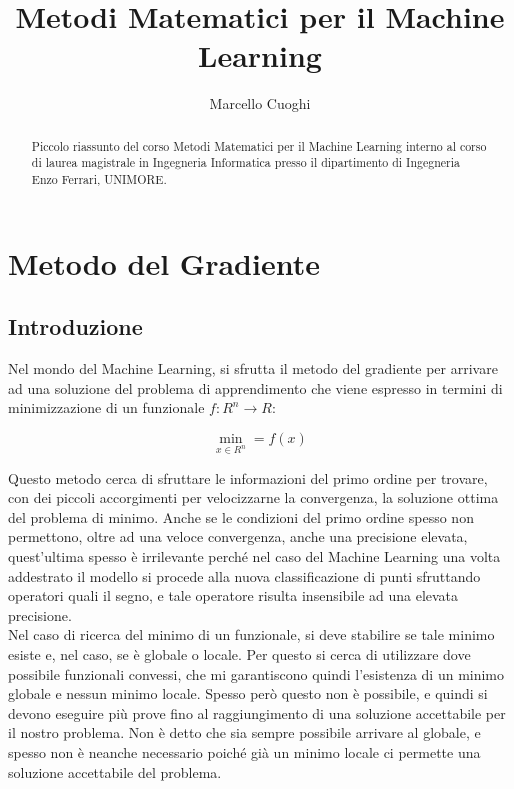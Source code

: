 \documentclass{report}
\begin{document}
 \title{Metodi Matematici per il Machine Learning}
\author{Marcello Cuoghi}

\maketitle

\newpage
\begin{abstract}
Piccolo riassunto del corso Metodi Matematici per il Machine Learning interno al corso di laurea magistrale in Ingegneria Informatica presso il dipartimento di Ingegneria Enzo Ferrari, UNIMORE.
\end{abstract}
\newpage

\tableofcontents{}
 
\chapter{Metodo del Gradiente}

\section{Introduzione}
Nel mondo del Machine Learning, si sfrutta il metodo del gradiente per arrivare ad una soluzione del problema di apprendimento che viene espresso in termini di minimizzazione di un funzionale $f: R^n \to R$:

\begin{equation}
    \label{min_funz}
    \min_{x \in R^n} = f(x)
\end{equation}

Questo metodo cerca di sfruttare le informazioni del primo ordine per trovare, con dei piccoli accorgimenti per velocizzarne la convergenza, la soluzione ottima del problema di minimo. Anche se le condizioni del primo ordine spesso non permettono, oltre ad una veloce convergenza, anche una precisione elevata, quest'ultima spesso è irrilevante perché nel caso del Machine Learning una volta addestrato il modello si procede alla nuova classificazione di punti sfruttando operatori quali il segno, e tale operatore risulta insensibile ad una elevata precisione.\\
Nel caso di ricerca del minimo di un funzionale, si deve stabilire se tale minimo esiste e, nel caso, se è globale o locale. Per questo si cerca di utilizzare dove possibile funzionali convessi, che mi garantiscono quindi l'esistenza di un minimo globale e nessun minimo locale. Spesso però questo non è possibile, e quindi si devono eseguire più prove fino al raggiungimento di una soluzione accettabile per il nostro problema. Non è detto che sia sempre possibile arrivare al globale, e spesso non è neanche necessario poiché già un minimo locale ci permette una soluzione accettabile del problema.
\end{document}
